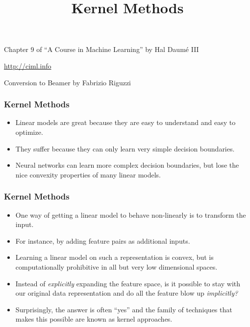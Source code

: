 \documentclass[trans]{beamer}
\title[Kernel Methods]
{Kernel Methods}
\institute[] %
{
}
\date{}
\newcommand{\myalert}[1]{{%
 #1}}
\begin{document}
\begin{frame}
\titlepage 
\vspace{-2cm}
\begin{center}
Chapter 9 of ``A Course in  Machine Learning'' by Hal Daum\'e III

\url{http://ciml.info}

Conversion to Beamer by Fabrizio Riguzzi
\end{center}

\end{frame}
  \renewcommand{\concept}[1]{\myalert{#1}}
  \renewcommand{\koncept}[2]{\myalert{#1}}

\renewcommand{\Figure}[3]{%
    \begin{center}
    \texttt{[image: ../book/figs/\#1]}
    \end{center}
  }
  
\begin{frame}
  \frametitle{Kernel Methods}
\begin{itemize}
\item Linear models are great because they are easy to
understand and easy to optimize.
\item  They suffer because they can only
learn very simple decision boundaries.
\item  Neural networks can learn more
complex decision boundaries, but lose the nice convexity properties of
many linear models.
\end{itemize}
\end{frame}
\begin{frame}
  \frametitle{Kernel Methods}
\begin{itemize}
\item 
One way of getting a linear model to behave non-linearly is to
transform the input. 
\item For instance, by adding feature pairs as
additional inputs. 
\item Learning a linear model on such a representation
is convex, but is computationally prohibitive in all but very low
dimensional spaces. 
\item Instead of \emph{explicitly}
expanding the feature space, is it possible to stay with our original
data representation and do all the feature blow up \emph{implicitly?}
\item 
Surprisingly, the answer is often ``yes'' and the family of techniques
that makes this possible are known as \concept{kernel} approaches.
\end{itemize}
\end{frame}
\end{document}
